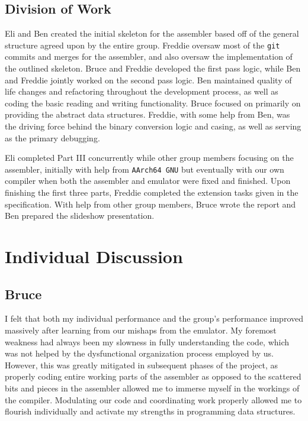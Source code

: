 \documentclass[11pt]{article}
\begin{document}
\subsection{Division of Work}

Eli and Ben created the initial skeleton for the assembler based off of the general structure 
agreed upon by the entire group. Freddie oversaw most of the \verb|git| commits and merges for 
the assembler, and also oversaw the implementation of the outlined skeleton. Bruce and Freddie 
developed the first pass logic, while Ben and Freddie jointly worked on the second pass logic. 
Ben maintained quality of life changes and refactoring throughout the development process, as 
well as coding the basic reading and writing functionality. Bruce focused on primarily on 
providing the abstract data structures. Freddie, with some help from Ben, was the driving force 
behind the binary conversion logic and casing, as well as serving as the primary debugging.

Eli completed Part III concurrently while other group members focusing on the assembler, 
initially with help from \verb|AArch64 GNU| but eventually with our own compiler when both the 
assembler and emulator were fixed and finished. Upon finishing the first three parts, Freddie 
completed the extension tasks given in the specification. With help from other group members, 
Bruce wrote the report and Ben prepared the slideshow presentation.

\section{Individual Discussion}

\subsection{Bruce}

I felt that both my individual performance and the group's performance improved massively after 
learning from our mishaps from the emulator. My foremost weakness had always been my slowness 
in fully understanding the code, which was not helped by the dysfunctional organization process 
employed by us. However, this was greatly mitigated in subsequent phases of the project, as 
properly coding entire working parts of the assembler as opposed to the scattered bits and 
pieces in the assembler allowed me to immerse myself in the workings of the compiler. 
Modulating our code and coordinating work properly allowed me to flourish individually and 
activate my strengths in programming data structures.
\end{document}

